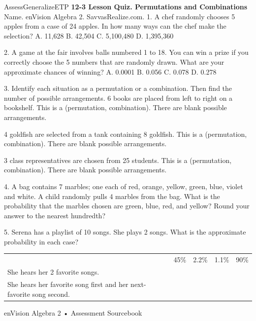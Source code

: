 \documentclass{article}
\newenvironment{te-addendum}[2]{}{}     %
\newcommand{\answer}[1]{}               %
\begin{document}
\begin{te-addendum}{Assess}{GeneralizeETP}
\textbf{12-3 Lesson Quiz. Permutations and Combinations}
Name. enVision Algebra 2. SavvasRealize.com.
1. A chef randomly chooses 5 apples from a case of 24 apples. In how many ways can the chef make the selection?
A. 11,628
B. 42,504
C. 5,100,480
D. 1,395,360
\answer{B}
2. A game at the fair involves balls numbered 1 to 18. You can win a prize if you correctly choose the 5 numbers that are randomly drawn. What are your approximate chances of winning?
A. 0.0001
B. 0.056
C. 0.078
D. 0.278
\answer{A}
3. Identify each situation as a permutation or a combination. Then find the number of possible arrangements.
6 books are placed from left to right on a bookshelf.
This is a (permutation, combination). There are blank possible arrangements.
\answer{permutation; 720}
4 goldfish are selected from a tank containing 8 goldfish.
This is a (permutation, combination). There are blank possible arrangements.
\answer{combination; 70}
3 class representatives are chosen from 25 students.
This is a (permutation, combination). There are blank possible arrangements.
\answer{combination; 2300}
4. A bag contains 7 marbles; one each of red, orange, yellow, green, blue, violet and white. A child randomly pulls 4 marbles from the bag. What is the probability that the marbles chosen are green, blue, red, and yellow? Round your answer to the nearest hundredth?
\answer{0.03}
5. Serena has a playlist of 10 songs. She plays 2 songs. What is the approximate probability in each case?
\begin{tabular}{lllll}
 & 45\% & 2.2\% & 1.1\% & 90\% \\
She hears her 2 favorite songs. & & \answer{2.2\%} & & \\
She hears her favorite song first and her next-favorite song second. & & & \answer{1.1\%} & \\
\end{tabular}
enVision Algebra 2 • Assessment Sourcebook
\end{te-addendum}
\end{document}
